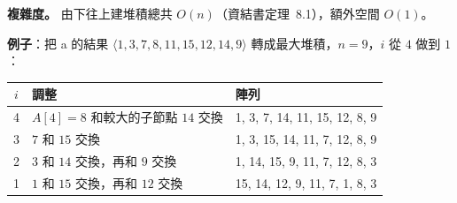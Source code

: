 \begin{pastsoln}
\textbf{複雜度。} 由下往上建堆積總共 $O(n)$（資結書定理~8.1），額外空間 $O(1)$。

\textbf{例子}：把 a 的結果 $\langle 1, 3, 7, 8, 11, 15, 12, 14, 9 \rangle$ 轉成最大堆積，$n = 9$，$i$ 從
$4$ 做到 $1$：
\begin{center}
\small
\begin{tabular}{cll}
\toprule
$i$ & 調整 & 陣列 \\
\midrule
4 & $A[4] = 8$ 和較大的子節點 $14$ 交換 & 1, 3, 7, 14, 11, 15, 12, 8, 9 \\
3 & $7$ 和 $15$ 交換 & 1, 3, 15, 14, 11, 7, 12, 8, 9 \\
2 & $3$ 和 $14$ 交換，再和 $9$ 交換 & 1, 14, 15, 9, 11, 7, 12, 8, 3 \\
1 & $1$ 和 $15$ 交換，再和 $12$ 交換 & 15, 14, 12, 9, 11, 7, 1, 8, 3 \\
\bottomrule
\end{tabular}
\end{center}
\end{pastsoln}
